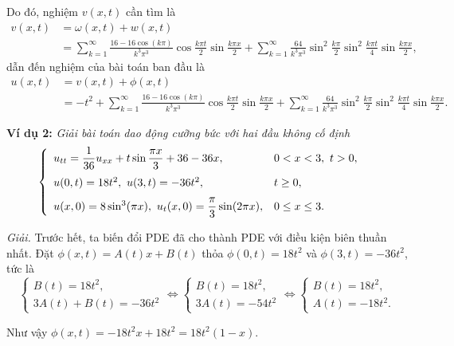 \documentclass[10pt, a4paper]{article}
\begin{document}
	Do đó, nghiệm $v(x,t)$ cần tìm là \begin{align*}
		v(x,t)&=\omega(x,t)+w(x,t)\\
		&=\sum_{k=1}^\infty\frac{16-16\cos(k\pi)}{k^3\pi^3}\cos\frac{k\pi t}{2}\sin\frac{k\pi x}{2}+\sum_{k=1}^\infty\frac{64}{k^3\pi^3}\sin^2\frac{k\pi}{2}\sin^2\frac{k\pi t}{4}\sin\frac{k\pi x}{2},
	\end{align*}
	dẫn đến nghiệm của bài toán ban đầu là \begin{align*}
		u(x,t)&=v(x,t)+\phi(x,t)\\
		&=-t^2+\sum_{k=1}^\infty\frac{16-16\cos(k\pi)}{k^3\pi^3}\cos\frac{k\pi t}{2}\sin\frac{k\pi x}{2}+\sum_{k=1}^\infty\frac{64}{k^3\pi^3}\sin^2\frac{k\pi}{2}\sin^2\frac{k\pi t}{4}\sin\frac{k\pi x}{2}.
	\end{align*}
	
	\textbf{Ví dụ 2:} \textit{Giải bài toán dao động cưỡng bức với hai đầu không cố định} $$\begin{cases}
		\begin{array}{ll}
			u_{tt}=\dfrac{1}{36}u_{xx}+t\sin\dfrac{\pi x}{3}+36-36x, & 0<x<3,~t>0, \\
			\noalign{\vskip5pt}
			u(0,t)=18t^2,~u(3,t)=-36t^2, & t\ge0, \\
			\noalign{\vskip6pt}
			u(x,0)=8\sin^3(\pi x),~u_t(x,0)=\dfrac\pi3\sin(2\pi x), & 0\le x\le3.
		\end{array}
	\end{cases}$$
	
	\textit{Giải.} Trước hết, ta biến đổi PDE đã cho thành PDE với điều kiện biên thuần nhất. Đặt $\phi(x,t)=A(t)x+B(t)$ thỏa $\phi(0,t)=18t^2$ và $\phi(3,t)=-36t^2$, tức là $$\begin{cases}
		B(t)=18t^2,\\
		3A(t)+B(t)=-36t^2
	\end{cases}\iff\begin{cases}
		B(t)=18t^2,\\
		3A(t)=-54t^2
	\end{cases}\iff\begin{cases}
		B(t)=18t^2,\\
		A(t)=-18t^2.
	\end{cases}$$
	
	Như vậy $\phi(x,t)=-18t^2x+18t^2=18t^2(1-x).$\\
	
\end{document}
